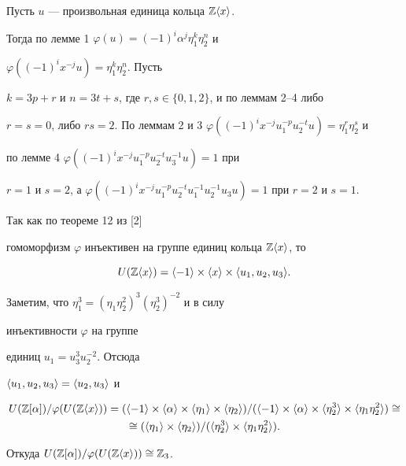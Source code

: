 \begin{pf} 


Пусть $u$ --- произвольная единица кольца $\Bbb Z\langle x\rangle$. 


Тогда по лемме 1\; $\varphi(u)=(-1)^i\alpha^j\eta^k_1\eta^n_2$ и 


$\varphi((-1)^i x^{-j}u)=\eta^k_1\eta^n_2$. Пусть  


$k=3p+r$ и $n=3t+s$, где $r,s\in\{0,1,2\}$, и по леммам 2--4 либо  


$r=s=0$, либо $rs=2$. По леммам 2 и 3\; $\varphi((-1)^i 


x^{-j}u^{-p}_1u^{-t}_2u)=\eta^r_1\eta^s_2$ и 


по лемме 4\; $\varphi((-1)^i x^{-j}u^{-p}_1u^{-t}_2u^{-1}_3u)=1$ при 


$r=1$ и $s=2$, а $\varphi((-1)^i 


x^{-j}u^{-p}_1u^{-t}_2u^{-1}_1u^{-1}_2u_3u)=1$ при $r=2$ и $s=1$. 


Так как по теореме 12 из [2]  


гомоморфизм $\varphi$ инъективен на группе единиц кольца $\Bbb Z\langle x\rangle$, то 


$$ 


U(\myzx)=\la-1\ra\times\la x\ra\times\la u_1,u_2,u_3\ra. 


$$ 


Заметим, что $\eta^3_1=(\eta_1\eta^2_2)^3(\eta^3_2)^{-2}$ и в силу 


инъективности $\varphi$ на группе  


единиц $u_1=u^3_3u^{-2}_2$. Отсюда 


$\langle u_1,u_2,u_3\rangle=\langle u_2,u_3\rangle$ и 


\begin{multline*} 


U(\myza)/\varphi(U(\myzx))=(\la-1\ra\times\la\alpha\ra 


\times\la\eta_1\ra\times\la\eta_2\ra)/ 


(\la-1\ra\times\la\alpha\ra\times\la\eta^3_2\ra 


\times\la\eta_1\eta^2_2\ra)\cong \\ 


% 


\cong(\la\eta_1\ra\times\la\eta_2\ra)/ 


(\la\eta^3_2\ra\times\la\eta_1\eta^2_2\ra). 


\end{multline*} 


Откуда $U(\Bbb Z[\alpha])/\varphi(U(\Bbb Z\langle x\rangle))\cong\Bbb Z_3$. 


\end{pf} 


